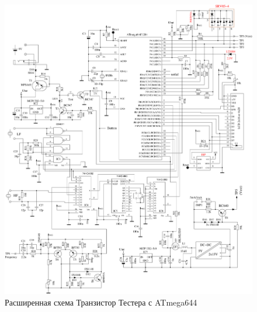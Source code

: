 \begin{figure}[H]
\centering
\includegraphics[width=1.\textwidth]{../FIG/t644tester.pdf}
\caption{Расширенная схема Транзистор Тестера с ATmega644}
\label{fig:t644tester}
\end{figure}

